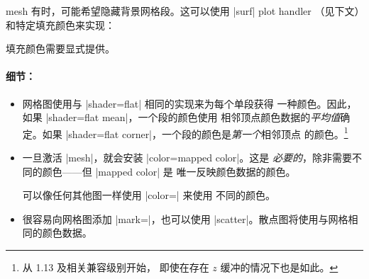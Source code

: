 {\begin{plottype}[/pgfplots]{mesh}
    有时，可能希望隐藏背景网格段。这可以使用 |surf| plot handler
    （见下文）和特定填充颜色来实现：
\pgfplotsexpensiveexample
\begin{codeexample}[]
\end{codeexample}
    填充颜色需要显式提供。


    \paragraph{细节：}

    \begin{itemize}
        \item 网格图使用与 |shader=flat| 相同的实现来为每个单段获得
            一种颜色。因此，如果 |shader=flat mean|，一个段的颜色使用
            相邻顶点颜色数据的\emph{平均值}确定。如果
            |shader=flat corner|，一个段的颜色是\emph{第一个}相邻顶点
            的颜色。\footnote{从 \PGFPlots{} 1.13 及相关兼容级别开始，
            即使在存在 $z$ 缓冲的情况下也是如此。}
        \item 一旦激活 |mesh|，就会安装 |color=mapped color|。这是
            \emph{必要的}，除非需要不同的颜色——但 |mapped color| 是
            唯一反映颜色数据的颜色。

            可以像任何其他图一样使用 |color=| 来使用
            不同的颜色。
        \item 很容易向网格图添加 |mark=|，也可以使用
            |scatter|。散点图将使用与网格相同的颜色数据。
    \end{itemize}

\pgfplotsexpensiveexample
\begin{codeexample}[]
\end{codeexample}


\end{plottype}}
